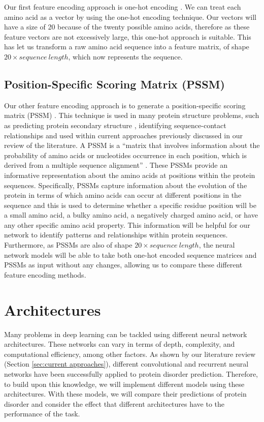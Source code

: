 \documentclass{l4proj}
\begin{document}
Our first feature encoding approach is one-hot encoding \citep{Fawcett:21}. We can treat each amino acid as a vector by using the one-hot encoding technique. Our vectors will have a size of 20 because of the twenty possible amino acids, therefore as these feature vectors are not excessively large, this one-hot approach is suitable. This has let us transform a raw amino acid sequence into a feature matrix, of shape $20 \times sequence\ length$, which now represents the sequence.

\subsection{Position-Specific Scoring Matrix (PSSM)}

Our other feature encoding approach is to generate a position-specific scoring matrix (PSSM) \citep{PSSM:wiki}. This technique is used in many protein structure problems, such as predicting protein secondary structure \citep{McGuffin:00}, identifying sequence-contact relationships \citep{Wang:17} and used within current approaches previously discussed in our review of the literature. A PSSM is a “matrix that involves information about the probability of amino acids or nucleotides occurrence in each position, which is derived from a multiple sequence alignment” \citep{Mohammadi:22}. These PSSMs provide an informative representation about the amino acids at positions within the protein sequences. Specifically, PSSMs capture information about the evolution of the protein in terms of which amino acids can occur at different positions in the sequence and this is used to determine whether a specific residue position will be a small amino acid, a bulky amino acid, a negatively charged amino acid, or have any other specific amino acid property. This information will be helpful for our network to identify patterns and relationships within protein sequences. Furthermore, as PSSMs are also of shape $20 \times sequence\ length$, the neural network models will be able to take both one-hot encoded sequence matrices and PSSMs as input without any changes, allowing us to compare these different feature encoding methods.

\section{Architectures}

Many problems in deep learning can be tackled using different neural network architectures. These networks can vary in terms of depth, complexity, and computational efficiency, among other factors. As shown by our literature review (Section \ref{sec:current approaches}), different convolutional and recurrent neural networks have been successfully applied to protein disorder prediction. Therefore, to build upon this knowledge, we will implement different models using these architectures. With these models, we will compare their predictions of protein disorder and consider the effect that different architectures have to the performance of the task.
\end{document}

